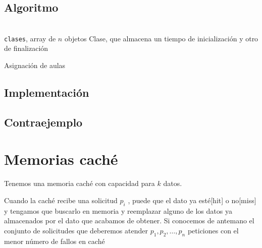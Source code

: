 \documentclass[a4paper, 11pt]{article} %
\let\emptyset\varnothing
\begin{document}
  \subsection{Algoritmo}
\begin{algorithm}[H]
	\begin{algorithmic}[1]
		\REQUIRE \ \\
        	\texttt{clases}, array de $n$ objetos Clase, que almacena
				 un tiempo de inicialización y otro de 
				 finalización\\
	  \WHILE{\texttt{sin\_colorear}$\neq \emptyset$}
	      \ENDIF
	    \ENDFOR
	    
	  \ENDWHILE
	\end{algorithmic}
    \caption{Asignación de aulas}
    \label{aulas}
\end{algorithm}
\subsection{Implementación}
\subsection{Contraejemplo}
\section{Memorias caché}
Tenemos una memoria caché con capacidad para $k$ datos.

Cuando la caché recibe una solicitud $p_i$ , puede que el dato ya esté[hit] o no[miss] y tengamos que buscarlo en memoria y reemplazar alguno de los datos ya almacenados por el dato que acabamos de obtener.
Si conocemos de antemano el conjunto de solicitudes que deberemos atender $p_1, p_2, \ldots, p_n$ peticiones con el menor número de fallos en caché
\end{document}

